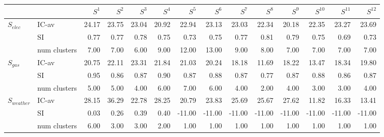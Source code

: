 \begin{tabular}{llrrrrrrrrrrrr}
\toprule
 &  & $S^{1}$ & $S^{2}$ & $S^{3}$ & $S^{4}$ & $S^{5}$ & $S^{6}$ & $S^{7}$ & $S^{8}$ & $S^{9}$ & $S^{10}$ & $S^{11}$ & $S^{12}$ \\
\midrule
\multirow[c]{3}{*}{$S_{elec}$} & IC-av & 24.17 & 23.75 & 23.04 & 20.92 & 22.94 & 23.13 & 23.03 & 22.34 & 20.18 & 22.35 & 23.27 & 23.69 \\
 & SI & 0.77 & 0.77 & 0.78 & 0.75 & 0.73 & 0.75 & 0.77 & 0.81 & 0.79 & 0.75 & 0.69 & 0.73 \\
 & num clusters & 7.00 & 7.00 & 6.00 & 9.00 & 12.00 & 13.00 & 9.00 & 8.00 & 7.00 & 7.00 & 7.00 & 7.00 \\
\multirow[c]{3}{*}{$S_{gas}$} & IC-av & 20.75 & 22.11 & 23.31 & 21.84 & 21.03 & 20.24 & 18.18 & 11.69 & 18.22 & 13.47 & 18.34 & 19.80 \\
 & SI & 0.95 & 0.86 & 0.87 & 0.90 & 0.87 & 0.88 & 0.87 & 0.77 & 0.87 & 0.88 & 0.86 & 0.87 \\
 & num clusters & 5.00 & 5.00 & 4.00 & 6.00 & 7.00 & 6.00 & 4.00 & 2.00 & 4.00 & 3.00 & 3.00 & 4.00 \\
\multirow[c]{3}{*}{$S_{weather}$} & IC-av & 28.15 & 36.29 & 22.78 & 28.25 & 20.79 & 23.83 & 25.69 & 25.67 & 27.62 & 11.82 & 16.33 & 13.41 \\
 & SI & 0.03 & 0.26 & 0.39 & 0.40 & -11.00 & -11.00 & -11.00 & -11.00 & -11.00 & -11.00 & -11.00 & -11.00 \\
 & num clusters & 6.00 & 3.00 & 3.00 & 2.00 & 1.00 & 1.00 & 1.00 & 1.00 & 1.00 & 1.00 & 1.00 & 1.00 \\
\bottomrule
\end{tabular}
